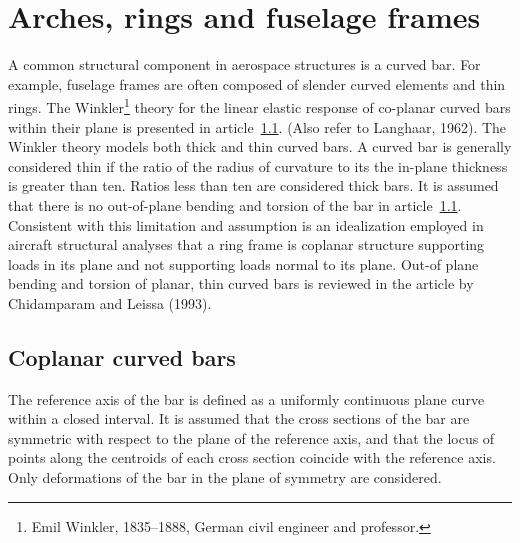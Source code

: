 \documentclass{AeroStructure-ERJohnson}
\begin{document}
\mainmatter

\setcounter{page}{175}

\setcounter{chapter}{6}

\chapter{Arches, rings and fuselage frames} \label{ch7}

A common structural component in aerospace structures is a curved bar. For example, fuselage frames are often composed of slender curved elements and thin rings. The Winkler\footnote{Emil Winkler, 1835--1888, German civil engineer and professor.} theory for the linear elastic response of co-planar curved bars within their plane is presented in article~\ref{sec7.1}. (Also refer to Langhaar, 1962). The Winkler theory models both thick and thin curved bars. A curved bar is generally considered thin if the ratio of the radius of curvature to its the in-plane thickness is greater than ten. Ratios less than ten are considered thick bars. It is assumed that there is no out-of-plane bending and torsion of the bar in article~\ref{sec7.1}. Consistent with this limitation and assumption is an idealization employed in aircraft structural analyses that a ring frame is coplanar structure supporting loads in its plane and not supporting loads normal to its plane. Out-of plane bending and torsion of planar, thin curved bars is reviewed in the article by Chidamparam and Leissa (1993).

\section{Coplanar curved bars}\label{sec7.1}

The reference axis of the bar is defined as a uniformly continuous plane curve within a closed interval. It is assumed that the cross sections of the bar are symmetric with respect to the plane of the reference axis, and that the locus of points along the centroids of each cross section coincide with the reference axis. Only deformations of the bar in the plane of symmetry are considered.

{\def\thefigure{7.1}
}
\end{document}
